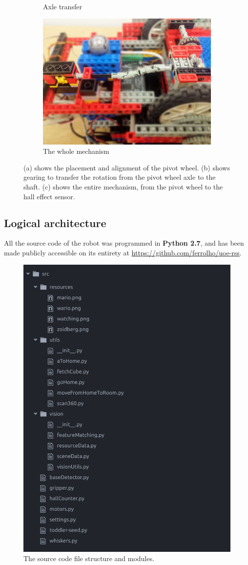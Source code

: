 \begin{figure}[ht]
\begin{subfigure}{0.32\textwidth}
        \caption{Axle transfer}
    \end{subfigure}
    \begin{subfigure}{0.32\textwidth}
        \includegraphics[width=\linewidth]{res/robot-pics/pivot-wheel-sensor.jpg}
        \caption{The whole mechanism}
    \end{subfigure}
    \caption{(a) shows the placement and alignment of the pivot wheel. (b) shows gearing to transfer the rotation from the pivot wheel axle to the shaft. (c) shows the entire mechanism, from the pivot wheel to the hall effect sensor.}
    \label{fig:pivot-wheel-system}
\end{figure}


\subsection{Logical architecture}

All the source code of the robot was programmed in \textbf{Python 2.7}, and has been made publicly accessible on its entirety at \url{https://github.com/ferrolho/uoe-rss}.

\begin{figure}[ht]
    \centering
    \includegraphics[width=0.45\linewidth]{res/source-architecture.png}
    \caption{The source code file structure and modules.}
    \label{fig:source-architecture}
\end{figure}

